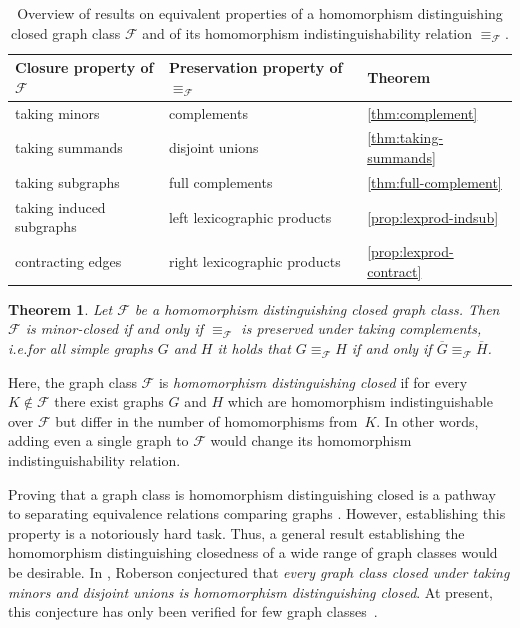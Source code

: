 \documentclass[3p,final]{elsarticle}
\DeclareMathOperator{\cl}{cl}
\newtheorem{theorem}{Theorem}
\begin{document}
	\begin{table}
		\centering
		\begin{tabular}{| l l l |}
			\hline
			\textbf{Closure property of $\mathcal{F}$} & \textbf{Preservation property of $\equiv_{\mathcal{F}}$} & \textbf{Theorem}\\ \hline
			taking minors   & complements      & \cref{thm:complement} \\  
			taking summands & disjoint unions   & \cref{thm:taking-summands} \\
			taking subgraphs& full complements & \cref{thm:full-complement} \\
			taking induced subgraphs & left lexicographic products  & \cref{prop:lexprod-indsub} \\ 
			contracting edges & right lexicographic products & \cref{prop:lexprod-contract} \\
			\hline
		\end{tabular}
		
		\caption{Overview of results on equivalent properties of a homomorphism distinguishing closed graph class $\mathcal{F}$ and of its homomorphism indistinguishability relation $\equiv_{\mathcal{F}}$.%
		}
		\label{tab:overview}
	\end{table}
	
	\begin{theorem} \label{thm:main2}
		Let $\mathcal{F}$ be a homomorphism distinguishing closed graph class.
		Then $\mathcal{F}$ is minor-closed if and only if $\equiv_{\mathcal{F}}$ is preserved under taking complements, i.e.\@ for all simple graphs $G$ and $H$ it holds that $G \equiv_{\mathcal{F}} H$ if and only if $\overline{G} \equiv_{\mathcal{F}} \overline{H}$.
	\end{theorem}
	
	Here, the graph class $\mathcal{F}$ is \emph{homomorphism distinguishing closed} \cite{roberson_oddomorphisms_2022} if for every $K \not\in \mathcal{F}$ there exist graphs $G$ and $H$ which are homomorphism indistinguishable over $\mathcal{F}$ but differ in the number of homomorphisms from~$K$. In other words, adding even a single graph to $\mathcal{F}$ would change its homomorphism indistinguishability relation.
	
	Proving that a graph class is homomorphism distinguishing closed is a pathway to separating equivalence relations comparing graphs \cite{roberson_lasserre_2023}.
	However, establishing this property is a notoriously hard task.
	Thus, a general result establishing the homomorphism distinguishing closedness of a wide range of graph classes would be desirable.
	In \cite{roberson_oddomorphisms_2022}, Roberson conjectured that \emph{every graph class closed under taking minors and disjoint unions is homomorphism distinguishing closed}.
	At present, this conjecture has only been  verified for few graph classes~\cite{roberson_oddomorphisms_2022,neuen_homomorphism-distinguishing_2023}.
	
\end{document}
